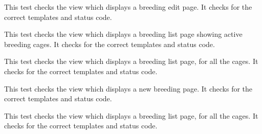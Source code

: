\documentclass[letterpaper,10pt,english]{sphinxmanual}
\begin{document}
\begin{fulllineitems}
\begin{fulllineitems}
\end{fulllineitems}


\begin{fulllineitems}
\label{api:mousedb.animal.tests.BreedingViewTests.test_breeding_edit}
This test checks the view which displays a breeding edit page.  It checks for the correct templates and status code.

\end{fulllineitems}


\begin{fulllineitems}
\label{api:mousedb.animal.tests.BreedingViewTests.test_breeding_list}
This test checks the view which displays a breeding list page showing active breeding cages.  It checks for the correct templates and status code.

\end{fulllineitems}


\begin{fulllineitems}
\label{api:mousedb.animal.tests.BreedingViewTests.test_breeding_list_all}
This test checks the view which displays a breeding list page, for all the cages.  It checks for the correct templates and status code.

\end{fulllineitems}


\begin{fulllineitems}
\label{api:mousedb.animal.tests.BreedingViewTests.test_breeding_new}
This test checks the view which displays a new breeding page.  It checks for the correct templates and status code.

\end{fulllineitems}


\begin{fulllineitems}
\label{api:mousedb.animal.tests.BreedingViewTests.test_timed_mating_list}
This test checks the view which displays a breeding list page, for all the cages.  It checks for the correct templates and status code.

\end{fulllineitems}


\end{fulllineitems}
\end{document}
